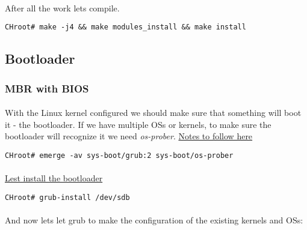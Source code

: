 \documentclass[11pt,a4paper]{article}
\begin{document}
                \newpage
                \paragraph{} After all the work lets compile.

                \begin{lstlisting}[style=BashInputCHRoot]
 CHroot# make -j4 && make modules_install && make install
                \end{lstlisting}

            \newpage
        \subsection{Bootloader}

                \subsubsection{MBR with BIOS}

                    \paragraph{} With the Linux kernel configured we should make sure that something will boot it - the bootloader. If we have multiple OSs or kernels, to make sure the bootloader will recognize it we need \textit{os-prober}. \href{https://wiki.gentoo.org/wiki/GRUB2}{Notes to follow here}

                    \begin{lstlisting}[style=BashInputCHRoot]
 CHroot# emerge -av sys-boot/grub:2 sys-boot/os-prober
                    \end{lstlisting}

                    \paragraph{}  \href{https://wiki.gentoo.org/wiki/GRUB2#BIOS_with_MBR}{Lest install the bootloader}

                    \begin{lstlisting}[style=BashInputCHRoot]
 CHroot# grub-install /dev/sdb
                    \end{lstlisting}

                    \paragraph{} And now lets let grub to make the configuration of the existing kernels and OSs:
\end{document}
